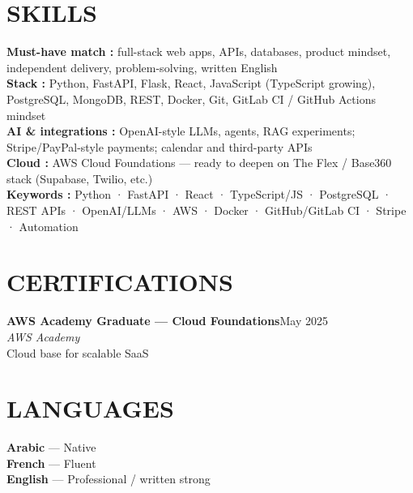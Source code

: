 \documentclass[10pt,a4paper]{article}
\newcommand{\TargetKeywords}{Python · FastAPI · React · TypeScript/JS · PostgreSQL · REST APIs · OpenAI/LLMs · AWS · Docker · GitHub/GitLab CI · Stripe · Automation}
\newcommand{\cert}[4]{%
  \textbf{\color{primary}\small #1}\hfill{\color{muted}\scriptsize #3}\\[-1pt]
  {\color{accent}\small\textit{#2}}\\[0pt]
  {\color{muted}\scriptsize #4}\\[4pt]
}
\begin{document}
\section{SKILLS}
{\small
\textbf{\color{primary}Must-have match :} full-stack web apps, APIs, databases, product mindset, independent delivery, problem-solving, written English\\[2pt]
\textbf{\color{primary}Stack :} Python, FastAPI, Flask, React, JavaScript (TypeScript growing), PostgreSQL, MongoDB, REST, Docker, Git, GitLab CI / GitHub Actions mindset\\[2pt]
\textbf{\color{primary}AI \& integrations :} OpenAI-style LLMs, agents, RAG experiments; Stripe/PayPal-style payments; calendar and third-party APIs\\[2pt]
\textbf{\color{primary}Cloud :} AWS Cloud Foundations --- ready to deepen on The Flex / Base360 stack (Supabase, Twilio, etc.)\\[2pt]
\textbf{\color{primary}Keywords :} \TargetKeywords
}

\vspace{2pt}
\begin{minipage}[t]{0.65\textwidth}
\section{CERTIFICATIONS}
\cert{AWS Academy Graduate --- Cloud Foundations}{AWS Academy}{May 2025}{Cloud base for scalable SaaS}
\end{minipage}%
\hfill
\begin{minipage}[t]{0.32\textwidth}
\section{LANGUAGES}
{\small\textbf{Arabic} --- Native}\\[2pt]
{\small\textbf{French} --- Fluent}\\[2pt]
{\small\textbf{English} --- Professional / written strong}
\end{minipage}
\end{document}
